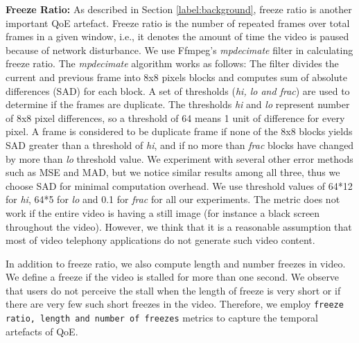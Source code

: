 
\noindent \textbf{Freeze Ratio:} As described in Section \ref{label:background}, freeze ratio is another important QoE artefact. 
Freeze ratio is the number of repeated frames over total frames in a given window, i.e., it denotes the amount of time the video is paused because of network disturbance. 
We use Ffmpeg's \textit{mpdecimate} \cite{ffmpeg} filter in calculating freeze ratio. 
The \textit{mpdecimate} algorithm works as follows: The filter divides the current and previous frame into 8x8 pixels blocks  and computes sum of absolute differences (SAD) for each block. 
A set of thresholds (\textit{hi, lo and frac}) are used to determine if the frames are duplicate. 
The thresholds \textit{hi} and \textit{lo} represent number of 8x8 pixel differences, so a threshold of 64 means 1 unit of difference for every pixel. A
frame is considered to be duplicate frame if none of the 8x8 blocks yields SAD greater than a threshold of \textit{hi}, and if no more than \textit{frac} blocks have changed by more than \textit{lo} threshold value. 
We experiment with several other error methods such as MSE and MAD, but we notice similar results among all three, thus we choose SAD for minimal computation overhead. 
We use threshold values of 64*12 for \textit{hi}, 64*5 for \textit{lo} and 0.1 for \textit{frac} for all our experiments. 
The metric does not work if the entire video is having a still image (for instance a black screen throughout the video). 
However, we think that it is a reasonable assumption that most of video telephony applications do not generate such video content.

In addition to freeze ratio, we also compute length and number freezes in video. We define a freeze if the video is stalled for more than one second. We observe that users do not perceive the stall when the length of freeze is very short or if there are very few such short freezes in the video. Therefore, we employ \texttt{freeze ratio, length and number of freezes} metrics to capture the temporal artefacts of QoE.

